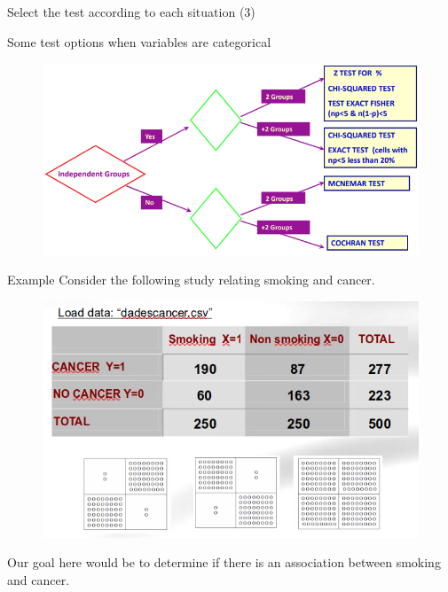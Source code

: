 \documentclass[
  ignorenonframetext,
]{beamer}
\begin{document}
\begin{frame}{Select the test according to each situation (3)}
\protect\hypertarget{select-the-test-according-to-each-situation-3}{}
\begin{block}{Some test options when variables are categorical}
\protect\hypertarget{some-test-options-when-variables-are-categorical}{}
\begin{figure}
\includegraphics[width=0.9\linewidth,height=0.9\textheight]{images/tests4categoricalVariables} \end{figure}
\end{block}
\end{frame}

\begin{frame}{Example}
\protect\hypertarget{example}{}
Consider the following study relating smoking and cancer.

\begin{figure}
\includegraphics[width=0.8\linewidth]{images/cancerAndSmoking1png} \end{figure}

Our goal here would be to determine if there is an association between
smoking and cancer.
\end{frame}
\end{document}
